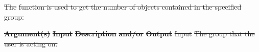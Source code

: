 \documentclass[12pt]{report} %
\providecommand{\DIFdeltex}[1]{{\protect\color{red}\sout{#1}}}                      %
\providecommand{\DIFdel}[1]{\texorpdfstring{\DIFdeltex{#1}}{}} %
\begin{document}

\DIFdel{The }%
\DIFdel{function is used to get the number of objects contained in the specified group.
}%


\textbf{\DIFdel{Argument(s)}} %
\textbf{\DIFdel{Input }}  %
\textbf{\DIFdel{Description}} %
\textbf{\DIFdel{and/or}}     %
\textbf{\DIFdel{Output}} %
\DIFdel{Input  }%
\DIFdel{The group that the user is acting on.   }%
\end{document}
